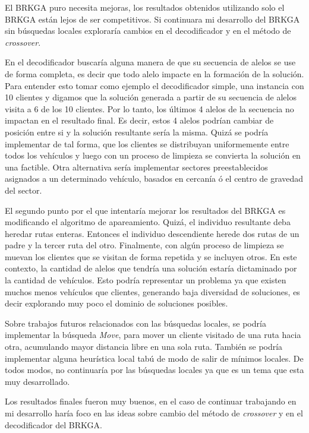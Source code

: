 \bigskip

El BRKGA puro necesita mejoras, los resultados obtenidos utilizando solo el BRKGA están lejos de ser competitivos. Si continuara mi desarrollo del BRKGA sin búsquedas locales exploraría cambios en el decodificador y en el método de \textit{crossover}. 

\bigskip

En el decodificador buscaría alguna manera de que su secuencia de alelos se use de forma completa, es decir que todo alelo impacte en la formación de la solución. Para entender esto tomar como ejemplo el decodificador simple, una instancia con 10 clientes y digamos que la solución generada a partir de su secuencia de alelos visita a 6 de los 10 clientes. Por lo tanto, los últimos 4 alelos de la secuencia no impactan en el resultado final. Es decir, estos 4 alelos podrían cambiar de posición entre si y la solución resultante sería la misma. Quizá se podría implementar de tal forma, que los clientes se distribuyan uniformemente entre todos los vehículos y luego con un proceso de limpieza se convierta la solución en una factible. Otra alternativa sería implementar sectores preestablecidos asignados a un determinado vehículo, basados en cercanía ó el centro de gravedad del sector.

\bigskip

El segundo punto por el que intentaría mejorar los resultados del BRKGA es modificando el algoritmo de apareamiento. Quizá, el individuo resultante deba heredar rutas enteras. Entonces el individuo descendiente herede dos rutas de un padre y la tercer ruta del otro. Finalmente, con algún proceso de limpieza se muevan los clientes que se visitan de forma repetida y se incluyen otros. En este contexto, la cantidad de alelos que tendría una solución estaría dictaminado por la cantidad de vehículos. Esto podría representar un problema ya que existen muchos menos vehículos que clientes, generando baja diversidad de soluciones, es decir explorando muy poco el dominio de soluciones posibles.

\bigskip

Sobre trabajos futuros relacionados con las búsquedas locales, se podría implementar la búsqueda \textit{Move}, para mover un cliente visitado de una ruta hacia otra, acumulando mayor distancia libre en una sola ruta. También se podría implementar alguna heurística local tabú de modo de salir de mínimos locales. De todos modos, no continuaría por las búsquedas locales ya que es un tema que esta muy desarrollado.

\bigskip

Los resultados finales fueron muy buenos, en el caso de continuar trabajando en mi desarrollo haría foco en las ideas sobre cambio del método de \textit{crossover} y en el decodificador del BRKGA.








